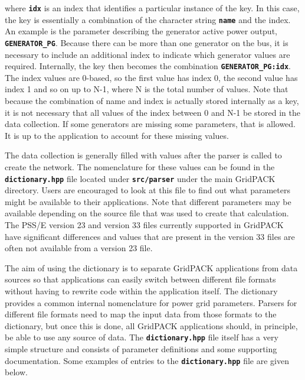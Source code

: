 where \texttt{\textbf{idx}} is an index that identifies a particular instance of the key. In this case, the key is essentially a combination of the character string \texttt{\textbf{name}} and the index. An example is the parameter describing the generator active power output, \texttt{\textbf{GENERATOR\_PG}}. Because there can be more than one generator on the bus, it is necessary to include an additional index to indicate which generator values are required. Internally, the key then becomes the combination \texttt{\textbf{GENERATOR\_PG:idx}}. The index values are 0-based, so the first value has index 0, the second value has index 1 and so on up to N-1, where N is the total number of values. Note that because the combination of name and index is actually stored internally as a key, it is not necessary that all values of the index between 0 and N-1 be stored in the data collection. If some generators are missing some parameters, that is allowed. It is up to the application to account for these missing values.

The data collection is generally filled with values after the parser is called to create the network. The nomenclature for these values can be found in the \texttt{\textbf{dictionary.hpp}} file located under \texttt{\textbf{src/parser}} under the main GridPACK directory. Users are encouraged to look at this file to find out what parameters might be available to their applications. Note that different parameters may be available depending on the source file that was used to create that calculation. The PSS/E version 23 and version 33 files currently supported in GridPACK have significant differences and values that are present in the version 33 files are often not available from a version 23 file.

The aim of using the dictionary is to separate GridPACK applications from data sources so that applications can easily switch between different file formats without having to rewrite code within the application itself. The dictionary provides a common internal nomenclature for power grid parameters. Parsers for different file formats need to map the input data from those formats to the dictionary, but once this is done, all GridPACK applications should, in principle, be able to use any source of data.
The \texttt{\textbf{dictionary.hpp}} file itself has a very simple structure and consists of parameter definitions and some supporting documentation. Some examples of entries to the \texttt{\textbf{dictionary.hpp}} file are given below.

